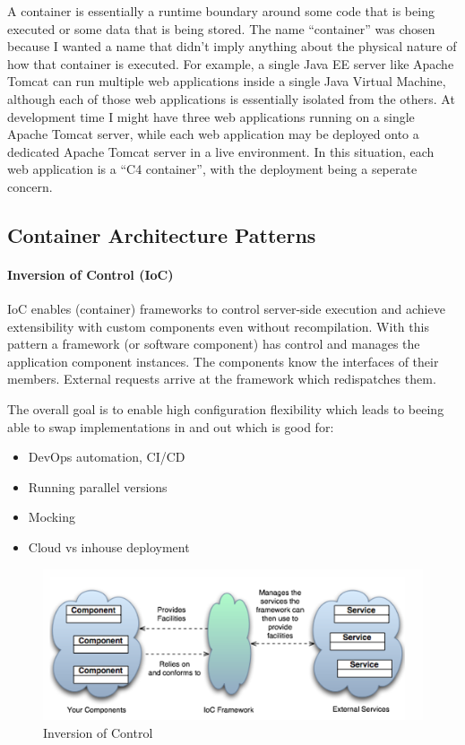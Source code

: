 \documentclass[../Main.tex]{subfiles}
\begin{document}
A container is essentially a runtime boundary around some code that is
being executed or some data that is being stored. The name “container”
was chosen because I wanted a name that didn’t imply anything about the
physical nature of how that container is executed. For example,
a single Java EE server like Apache Tomcat can run multiple web
applications inside a single Java Virtual Machine, although each of
those web applications is essentially isolated from the others.
At development time I might have three web applications running on
a single Apache Tomcat server, while each web application may be
deployed onto a dedicated Apache Tomcat server in a live environment.
In this situation, each web application is a “C4 container”,
with the deployment being a seperate concern.

\subsection{Container Architecture Patterns}
\paragraph{Inversion of Control (IoC)}
IoC enables (container) frameworks to control server-side execution
and achieve extensibility with custom components even without recompilation.
With this pattern a framework (or software component) has control and
manages the application component instances.
The components know the interfaces of their members.
External requests arrive at the framework which redispatches them.

The overall goal is to enable high configuration flexibility
which leads to beeing able to swap implementations in and out which
is good for:
\begin{itemize}
    \item DevOps automation, CI/CD
    \item Running parallel versions
    \item Mocking
    \item Cloud vs inhouse deployment
\end{itemize}

\begin{figure}[H]
    \centering
    \includegraphics[width=1\linewidth]{Images/ioc.png}
    \caption{Inversion of Control}
\end{figure}
\end{document}

